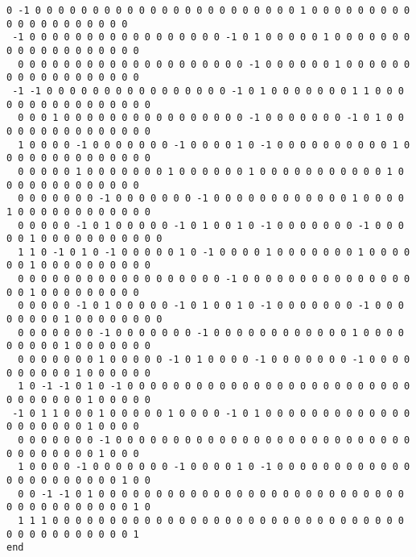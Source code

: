 \documentclass[%
 showpacs,
 showkeys,
 preprintnumbers,
 amsmath,amssymb,
 aps,
  pra,
  longbibliography,
 floatfix,
 ]{revtex4-1}
\begin{document}
{\begin{lstlisting}[backgroundcolor=\color{yellow!10},framerule=0pt,breaklines=true, frame=tb]
  0 -1 0 0 0 0 0 0 0 0 0 0 0 0 0 0 0 0 0 0 0 0 0 0 0 1 0 0 0 0 0 0 0 0 0 0 0 0 0 0 0 0 0 0 0 0
 -1 0 0 0 0 0 0 0 0 0 0 0 0 0 0 0 0 0 -1 0 1 0 0 0 0 0 1 0 0 0 0 0 0 0 0 0 0 0 0 0 0 0 0 0 0 0
  0 0 0 0 0 0 0 0 0 0 0 0 0 0 0 0 0 0 0 0 -1 0 0 0 0 0 0 1 0 0 0 0 0 0 0 0 0 0 0 0 0 0 0 0 0 0
 -1 -1 0 0 0 0 0 0 0 0 0 0 0 0 0 0 0 0 -1 0 1 0 0 0 0 0 0 0 1 1 0 0 0 0 0 0 0 0 0 0 0 0 0 0 0 0
  0 0 0 1 0 0 0 0 0 0 0 0 0 0 0 0 0 0 0 0 -1 0 0 0 0 0 0 0 -1 0 1 0 0 0 0 0 0 0 0 0 0 0 0 0 0 0
  1 0 0 0 0 -1 0 0 0 0 0 0 0 -1 0 0 0 0 1 0 -1 0 0 0 0 0 0 0 0 0 0 1 0 0 0 0 0 0 0 0 0 0 0 0 0 0
  0 0 0 0 0 1 0 0 0 0 0 0 0 1 0 0 0 0 0 0 1 0 0 0 0 0 0 0 0 0 0 0 1 0 0 0 0 0 0 0 0 0 0 0 0 0
  0 0 0 0 0 0 0 -1 0 0 0 0 0 0 0 -1 0 0 0 0 0 0 0 0 0 0 0 0 1 0 0 0 0 1 0 0 0 0 0 0 0 0 0 0 0 0
  0 0 0 0 0 -1 0 1 0 0 0 0 0 -1 0 1 0 0 1 0 -1 0 0 0 0 0 0 0 -1 0 0 0 0 0 1 0 0 0 0 0 0 0 0 0 0 0
  1 1 0 -1 0 1 0 -1 0 0 0 0 0 1 0 -1 0 0 0 0 1 0 0 0 0 0 0 0 1 0 0 0 0 0 0 1 0 0 0 0 0 0 0 0 0 0
  0 0 0 0 0 0 0 0 0 0 0 0 0 0 0 0 0 0 -1 0 0 0 0 0 0 0 0 0 0 0 0 0 0 0 0 0 1 0 0 0 0 0 0 0 0 0
  0 0 0 0 0 -1 0 1 0 0 0 0 0 -1 0 1 0 0 1 0 -1 0 0 0 0 0 0 0 -1 0 0 0 0 0 0 0 0 1 0 0 0 0 0 0 0 0
  0 0 0 0 0 0 0 -1 0 0 0 0 0 0 0 -1 0 0 0 0 0 0 0 0 0 0 0 0 1 0 0 0 0 0 0 0 0 0 1 0 0 0 0 0 0 0
  0 0 0 0 0 0 0 1 0 0 0 0 0 -1 0 1 0 0 0 0 -1 0 0 0 0 0 0 0 -1 0 0 0 0 0 0 0 0 0 0 1 0 0 0 0 0 0
  1 0 -1 -1 0 1 0 -1 0 0 0 0 0 0 0 0 0 0 0 0 0 0 0 0 0 0 0 0 0 0 0 0 0 0 0 0 0 0 0 0 1 0 0 0 0 0
 -1 0 1 1 0 0 0 1 0 0 0 0 0 1 0 0 0 0 -1 0 1 0 0 0 0 0 0 0 0 0 0 0 0 0 0 0 0 0 0 0 0 1 0 0 0 0
  0 0 0 0 0 0 0 -1 0 0 0 0 0 0 0 0 0 0 0 0 0 0 0 0 0 0 0 0 0 0 0 0 0 0 0 0 0 0 0 0 0 0 1 0 0 0
  1 0 0 0 0 -1 0 0 0 0 0 0 0 -1 0 0 0 0 1 0 -1 0 0 0 0 0 0 0 0 0 0 0 0 0 0 0 0 0 0 0 0 0 0 1 0 0
  0 0 -1 -1 0 1 0 0 0 0 0 0 0 0 0 0 0 0 0 0 0 0 0 0 0 0 0 0 0 0 0 0 0 0 0 0 0 0 0 0 0 0 0 0 1 0
  1 1 1 0 0 0 0 0 0 0 0 0 0 0 0 0 0 0 0 0 0 0 0 0 0 0 0 0 0 0 0 0 0 0 0 0 0 0 0 0 0 0 0 0 0 1
end

\end{lstlisting}  }
\end{document}
